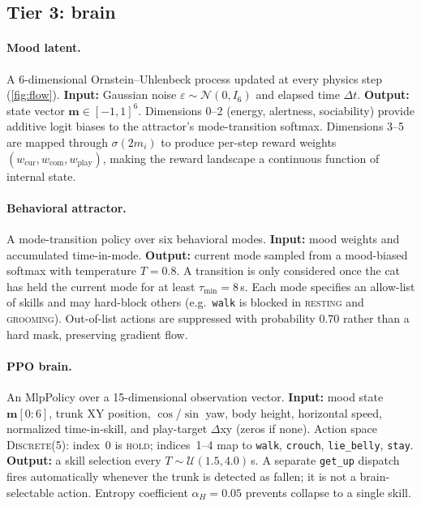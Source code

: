 \documentclass[11pt]{article}
\begin{document}
\subsection{Tier 3: brain}
\label{subsec:brain}

\paragraph{Mood latent.}
A 6-dimensional Ornstein--Uhlenbeck process updated at every physics step (\cref{fig:flow}).
\textbf{Input:} Gaussian noise $\varepsilon \sim \mathcal{N}(0,I_6)$ and elapsed time $\Delta t$.
\textbf{Output:} state vector $\mathbf{m}\in[-1,1]^6$.
Dimensions 0--2 (energy, alertness, sociability) provide additive logit biases
to the attractor's mode-transition softmax.
Dimensions 3--5 are mapped through $\sigma(2m_i)$ to produce per-step reward weights
$(w_\text{cur}, w_\text{com}, w_\text{play})$, making the reward landscape
a continuous function of internal state.

\paragraph{Behavioral attractor.}
A mode-transition policy over six behavioral modes.
\textbf{Input:} mood weights and accumulated time-in-mode.
\textbf{Output:} current mode sampled from a mood-biased softmax with temperature $T\!=\!0.8$.
A transition is only considered once the cat has held the current mode
for at least $\tau_{\min}\!=\!8$\,s.
Each mode specifies an allow-list of skills and may hard-block others
(e.g.\ \texttt{walk} is blocked in \textsc{resting} and \textsc{grooming}).
Out-of-list actions are suppressed with probability 0.70 rather than a
hard mask, preserving gradient flow.

\paragraph{PPO brain.}
An MlpPolicy over a 15-dimensional observation vector.
\textbf{Input:} mood state $\mathbf{m}[0{:}6]$, trunk XY position,
$\cos$/$\sin$ yaw, body height, horizontal speed, normalized time-in-skill,
and play-target $\Delta$xy (zeros if none).
Action space \textsc{Discrete}(5): index~0 is \textsc{hold};
indices~1--4 map to \texttt{walk}, \texttt{crouch}, \texttt{lie\_belly}, \texttt{stay}.
\textbf{Output:} a skill selection every $T \sim \mathcal{U}(1.5, 4.0)$\,s.
A separate \texttt{get\_up} dispatch fires automatically whenever the trunk
is detected as fallen; it is not a brain-selectable action.
Entropy coefficient $\alpha_H\!=\!0.05$ prevents collapse to a single skill.
\end{document}
